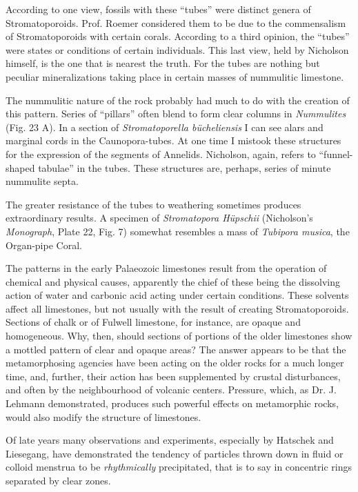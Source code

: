 \documentclass[a4paper, 12pt, oneside]{article}
\begin{document}
According to one view, fossils with these ``tubes'' were distinct genera of Stromatoporoids. Prof. Roemer considered them to be due to the commensalism of Stromatoporoids with certain corals. According to a third opinion, the ``tubes'' were states or conditions of certain individuals. This last view, held by Nicholson himself, is the one that is nearest the truth. For the tubes are nothing but peculiar mineralizations taking place in certain masses of nummulitic limestone.

The nummulitic nature of the rock probably had much to do with the creation of this pattern. Series of ``pillars'' often blend to form clear columns in \emph{Nummulites} (Fig. 23 A). In a section of \emph{Stromatoporella bücheliensis} I can see alars and marginal cords in the Caunopora-tubes. At one time I mistook these structures for the expression of the segments of Annelids. Nicholson, again, refers to ``funnel-shaped tabulae'' in the tubes. These structures are, perhaps, series of minute nummulite septa.

The greater resistance of the tubes to weathering sometimes produces extraordinary results. A specimen of \emph{Stromatopora Hüpschii} (Nicholson's \emph{Monograph}, Plate 22, Fig. 7) somewhat resembles a mass of \emph{Tubipora musica}, the Organ-pipe Coral.

The patterns in the early Palaeozoic limestones result from the operation of chemical and physical causes, apparently the chief of these being the dissolving action of water and carbonic acid acting under certain conditions. These solvents affect all limestones, but not usually with the result of creating Stromatoporoids. Sections of chalk or of Fulwell limestone, for instance, are opaque and homogeneous. Why, then, should sections of portions of the older limestones show a mottled pattern of clear and opaque areas? The answer appears to be that the metamorphosing agencies have been acting on the older rocks for a much longer time, and, further, their action has been supplemented by crustal disturbances, and often by the neighbourhood of volcanic centers. Pressure, which, as Dr. J. Lehmann demonstrated, produces such powerful effects on metamorphic rocks, would also modify the structure of limestones.

Of late years many observations and experiments, especially by Hatschek and Liesegang, have demonstrated the tendency of particles thrown down in fluid or colloid menstrua to be \emph{rhythmically} precipitated, that is to say in concentric rings separated by clear zones.
\end{document}
